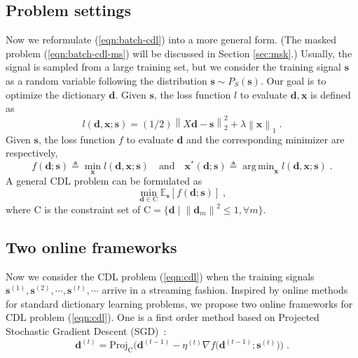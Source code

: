 \documentclass[final]{siamart1116}
\newcommand{\mb}[1]{\mathbf{#1}}
\providecommand{\norm}[1]{\left\lVert#1\right\rVert}
\DeclareMathOperator*{\argmin}{arg\,min}
\def \E  {\mathbb{E}}
\begin{document}
\subsection{Problem settings}
\label{sec:settings}

Now we reformulate (\ref{eqn:batch-cdl}) into a more general form. (The masked problem (\ref{eqn:batch-cdl-ms}) will be discussed in Section \ref{sec:msk}.) Usually, the signal is sampled from a large training set, but we consider the training signal $\mb{s}$ as a random variable following the distribution $\mb{s} \sim P_S (\mb{s})$.  Our goal is to optimize the dictionary $\mb{d}$.  Given $\mb{s}$, the loss function $l$ to evaluate $\mb{d},\mb{x}$ is defined as
\begin{equation}
\label{eqn:basic_l}
l(\mb{d},\mb{x}; \mb{s}) = (1/2) \norm{X \mb{d} - \mb{s}}_2^2 + \lambda \norm{\mb{x}}_1 \;.
\end{equation}
Given $\mb{s}$, the loss function $f$ to evaluate $\mb{d}$ and the corresponding minimizer are respectively,
\begin{equation}
f(\mb{d}; \mb{s}) \triangleq \min_{\mb{x}} l(\mb{d},\mb{x};\mb{s})
 \quad \text{and} \quad
\mb{x}^*(\mb{d};\mb{s}) \triangleq \argmin_{\mb{x}}  l(\mb{d},\mb{x};\mb{s}) \;. \label{eqn:cbpdn}
\end{equation}
A general CDL problem can be formulated as
\begin{equation}
\label{eqn:cdl}
\min_{\mb{d}\in \text{C}} \E_{\mb{s}}[ f(\mb{d}; \mb{s})]\;,
\end{equation}
where $\text{C}$ is the constraint set of
$\text{C}=\{ \mb{d} \;| \; \norm{\mb{d}_m}^2\leq1, \forall m \}$.


\subsection{Two online frameworks}
\label{sec:framework}

Now we consider the CDL problem (\ref{eqn:cdl}) when the training signals $\mb{s}^{(1)}, \mb{s}^{(2)}, \cdots, \mb{s}^{(t)},\cdots$ arrive in a streaming fashion. Inspired by online methods for standard dictionary learning problems,
we propose two online frameworks for CDL problem (\ref{eqn:cdl}). One is a first order method based on Projected Stochastic Gradient Descent (SGD)~\cite{wang2010locality, mairal2012task, aharon2008sparse}:
\begin{equation}
\label{eqn:psgd}
\mb{d}^{(t)} = \text{Proj}_{\text{C}}\Big(\mb{d}^{(t-1)} - \eta^{(t)}\nabla f\big(\mb{d}^{(t-1)}; \mb{s}^{(t)}\big) \Big) \;.
\end{equation}
\end{document}
